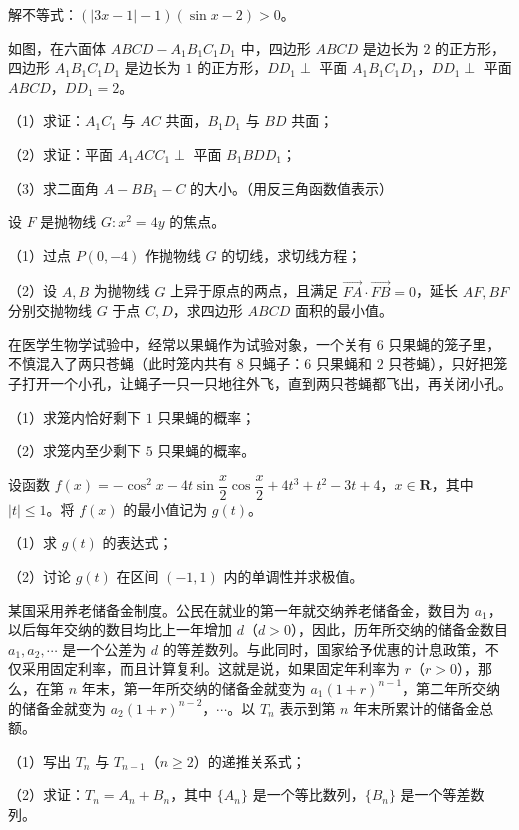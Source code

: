 \begin{question}
解不等式：$(|3x-1|-1)(\sin x-2)>0$。

\Needspace{0.4\textheight}
\end{question}
\begin{question}
如图，在六面体 $ABCD-A_1B_1C_1D_1$ 中，四边形 $ABCD$ 是边长为 $2$ 的正方形，四边形 $A_1B_1C_1D_1$ 是边长为 $1$ 的正方形，$DD_1\perp$ 平面 $A_1B_1C_1D_1$，$DD_1\perp$ 平面 $ABCD$，$DD_1=2$。
\nopagebreak[4]
\begin{center}\end{center}
\nopagebreak[4]
（1）求证：$A_1C_1$ 与 $AC$ 共面，$B_1D_1$ 与 $BD$ 共面；

（2）求证：平面 $A_1ACC_1\perp$ 平面 $B_1BDD_1$；

（3）求二面角 $A-BB_1-C$ 的大小。（用反三角函数值表示）

\end{question}
\begin{question}
设 $F$ 是抛物线 $G:x^2=4y$ 的焦点。

（1）过点 $P(0,-4)$ 作抛物线 $G$ 的切线，求切线方程；

（2）设 $A,B$ 为抛物线 $G$ 上异于原点的两点，且满足 $\overrightarrow{FA}\cdot\overrightarrow{FB}=0$，延长 $AF,BF$ 分别交抛物线 $G$ 于点 $C,D$，求四边形 $ABCD$ 面积的最小值。

\end{question}
\begin{question}
在医学生物学试验中，经常以果蝇作为试验对象，一个关有 $6$ 只果蝇的笼子里，不慎混入了两只苍蝇（此时笼内共有 $8$ 只蝇子：$6$ 只果蝇和 $2$ 只苍蝇），只好把笼子打开一个小孔，让蝇子一只一只地往外飞，直到两只苍蝇都飞出，再关闭小孔。

（1）求笼内恰好剩下 $1$ 只果蝇的概率；

（2）求笼内至少剩下 $5$ 只果蝇的概率。

\end{question}
\begin{question}
设函数 $f(x)=-\cos^2x-4t\sin\dfrac x2\cos\dfrac x2+4t^3+t^2-3t+4$，$x\in\mathbf R$，其中 $|t|\leqslant1$。将 $f(x)$ 的最小值记为 $g(t)$。

（1）求 $g(t)$ 的表达式；

（2）讨论 $g(t)$ 在区间 $(-1,1)$ 内的单调性并求极值。

\end{question}
\begin{question}
某国采用养老储备金制度。公民在就业的第一年就交纳养老储备金，数目为 $a_1$，以后每年交纳的数目均比上一年增加 $d$（$d>0$），因此，历年所交纳的储备金数目 $a_1,a_2,\cdots$ 是一个公差为 $d$ 的等差数列。与此同时，国家给予优惠的计息政策，不仅采用固定利率，而且计算复利。这就是说，如果固定年利率为 $r$（$r>0$），那么，在第 $n$ 年末，第一年所交纳的储备金就变为 $a_1(1+r)^{n-1}$，第二年所交纳的储备金就变为 $a_2(1+r)^{n-2}$，$\cdots$。以 $T_n$ 表示到第 $n$ 年末所累计的储备金总额。

（1）写出 $T_n$ 与 $T_{n-1}$（$n\geqslant2$）的递推关系式；

（2）求证：$T_n=A_n+B_n$，其中 $\{A_n\}$ 是一个等比数列，$\{B_n\}$ 是一个等差数列。

\end{question}